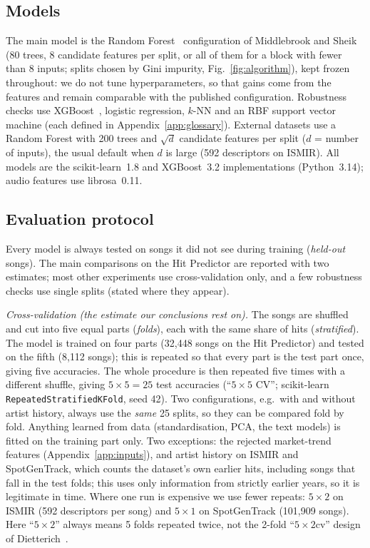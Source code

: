\documentclass[conference]{IEEEtran}
\begin{document}
\subsection{Models}
The main model is the Random Forest~\cite{breiman2001random} configuration of Middlebrook
and Sheik~\cite{middlebrook2019song} (80 trees, 8 candidate features per split, or all of them for a block with
fewer than 8 inputs; splits chosen by Gini impurity, Fig.~\ref{fig:algorithm}),
kept frozen throughout: we do not tune hyperparameters, so that gains come from the
features and remain comparable with the published configuration. Robustness checks use XGBoost~\cite{chen2016xgboost}, logistic
regression, $k$-NN and an RBF support vector machine (each defined in Appendix~\ref{app:glossary}). External datasets use a Random Forest
with 200 trees and $\sqrt{d}$ candidate features per split ($d$ = number of inputs), the usual default when $d$
is large (592 descriptors on ISMIR). All models are the scikit-learn~1.8 and XGBoost~3.2 implementations
(Python~3.14); audio features use librosa~0.11.

\subsection{Evaluation protocol}\label{sec:protocol}
Every model is always tested on songs it did not see during training (\emph{held-out} songs). The main
comparisons on the Hit Predictor are reported with two estimates; most other experiments use cross-validation
only, and a few robustness checks use single splits (stated where they appear).

\emph{Cross-validation (the estimate our conclusions rest on).} The songs are shuffled and cut into five equal
parts (\emph{folds}), each with the same share of hits (\emph{stratified}). The model is trained on four parts
(32{,}448 songs on the Hit Predictor) and tested on the fifth (8{,}112 songs); this is repeated so that every part
is the test part once, giving five accuracies. The whole procedure is then repeated five times with a
different shuffle, giving $5\times5=25$ test accuracies (``$5{\times}5$ CV''; scikit-learn
\texttt{RepeatedStratifiedKFold}, seed 42). Two configurations, e.g.\ with and without artist history, always use
the \emph{same} 25 splits, so they can be compared fold by fold. Anything learned from data (standardisation, PCA,
the text models) is fitted on the training part only. Two exceptions: the rejected market-trend features
(Appendix~\ref{app:inputs}), and artist history on ISMIR and SpotGenTrack, which counts the dataset's own earlier hits,
including songs that fall in the test folds; this uses only information from strictly earlier years, so it is
legitimate in time. Where one run is expensive we use fewer repeats:
$5{\times}2$ on ISMIR (592 descriptors per song) and $5{\times}1$ on SpotGenTrack (101{,}909 songs). Here
``$5{\times}2$'' always means 5 folds repeated twice, not the 2-fold ``$5{\times}2$cv'' design of
Dietterich~\cite{dietterich1998approximate}.
\end{document}

